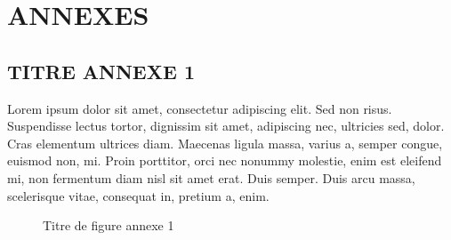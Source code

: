 \chapter*{ANNEXES}
\adjustmtc
\thispagestyle{MyStyle}

\makeatletter\renewcommand{}\makeatother


\appendix
\renewcommand{\thefigure}{A.\arabic{figure}}
\setcounter{figure}{0}
\section{TITRE ANNEXE 1}
Lorem ipsum dolor sit amet, consectetur adipiscing elit. Sed non risus. Suspendisse lectus tortor, dignissim sit amet, adipiscing nec, ultricies sed, dolor. Cras elementum ultrices diam. Maecenas ligula massa, varius a, semper congue, euismod non, mi. Proin porttitor, orci nec nonummy molestie, enim est eleifend mi, non fermentum diam nisl sit amet erat. Duis semper. Duis arcu massa, scelerisque vitae, consequat in, pretium a, enim.\par
\begin{figure}[H]%
    \center%
    \setlength{\fboxsep}{5pt}%
    \setlength{\fboxrule}{0.5pt}%
    \caption{Titre de figure annexe 1}%
\end{figure}
